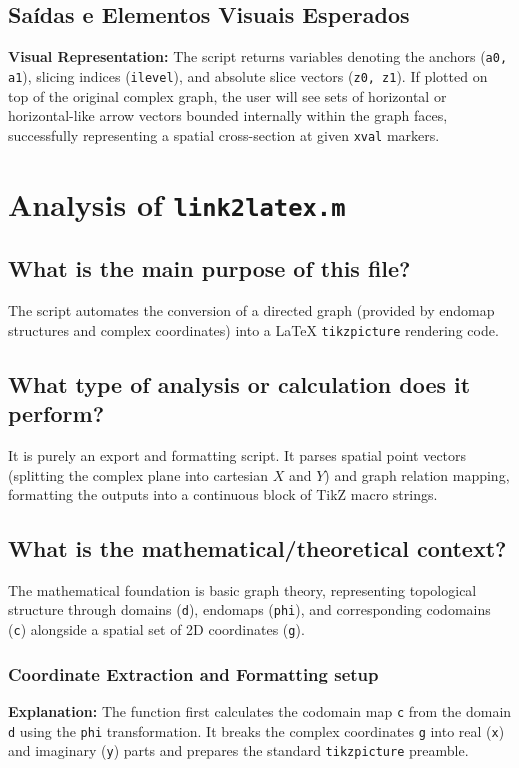\section{Saídas e Elementos Visuais Esperados}
\textbf{Visual Representation:} The script returns variables denoting the anchors (\texttt{a0, a1}), slicing indices (\texttt{ilevel}), and absolute slice vectors (\texttt{z0, z1}). If plotted on top of the original complex graph, the user will see sets of horizontal or horizontal-like arrow vectors bounded internally within the graph faces, successfully representing a spatial cross-section at given \texttt{xval} markers.


\newpage
\chapter{Analysis of \texttt{link2latex.m}}

\section{What is the main purpose of this file?}
The script automates the conversion of a directed graph (provided by endomap structures and complex coordinates) into a LaTeX \texttt{tikzpicture} rendering code. 

\section{What type of analysis or calculation does it perform?}
It is purely an export and formatting script. It parses spatial point vectors (splitting the complex plane into cartesian $X$ and $Y$) and graph relation mapping, formatting the outputs into a continuous block of TikZ macro strings.

\section{What is the mathematical/theoretical context?}
The mathematical foundation is basic graph theory, representing topological structure through domains (\texttt{d}), endomaps (\texttt{phi}), and corresponding codomains (\texttt{c}) alongside a spatial set of 2D coordinates (\texttt{g}).

\subsection{Coordinate Extraction and Formatting setup}
\textbf{Explanation:} 
The function first calculates the codomain map \texttt{c} from the domain \texttt{d} using the \texttt{phi} transformation. It breaks the complex coordinates \texttt{g} into real (\texttt{x}) and imaginary (\texttt{y}) parts and prepares the standard \texttt{tikzpicture} preamble.

